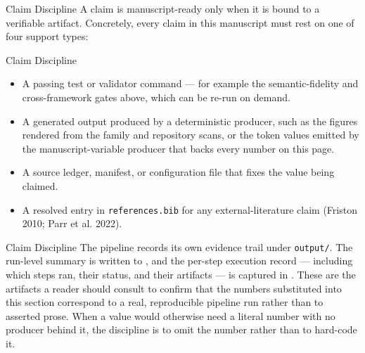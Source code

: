 \documentclass[
  ignorenonframetext,
]{beamer}
\providecommand{\tightlist}{%
  \setlength{\itemsep}{0pt}\setlength{\parskip}{0pt}}
\begin{document}
\begin{frame}{Claim Discipline}
\protect{}\label{claim-discipline}
A claim is manuscript-ready only when it is bound to a verifiable
artifact. Concretely, every claim in this manuscript must rest on one of
four support types:

\end{frame}

\begin{frame}{Claim Discipline}
\begin{itemize}
\tightlist
\item
  A passing test or validator command --- for example the
  semantic-fidelity and cross-framework gates above, which can be re-run
  on demand.
\item
  A generated output produced by a deterministic producer, such as the
  figures rendered from the family and repository scans, or the token
  values emitted by the manuscript-variable producer that backs every
  number on this page.
\item
  A source ledger, manifest, or configuration file that fixes the value
  being claimed.
\item
  A resolved entry in \texttt{references.bib} for any
  external-literature claim (Friston 2010; Parr et al. 2022).
\end{itemize}

\end{frame}

\begin{frame}{Claim Discipline}
The pipeline records its own evidence trail under \texttt{output/}. The
run-level summary is written to , and
the per-step execution record --- including which steps ran, their
status, and their artifacts --- is captured in
. These are the artifacts a reader
should consult to confirm that the numbers substituted into this section
correspond to a real, reproducible pipeline run rather than to asserted
prose. When a value would otherwise need a literal number with no
producer behind it, the discipline is to omit the number rather than to
hard-code it.
\end{frame}
\end{document}

